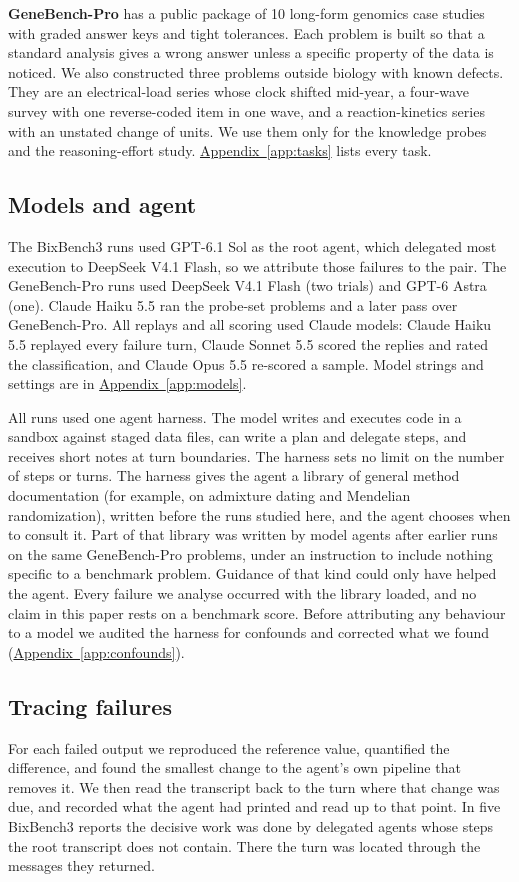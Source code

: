 \documentclass[10pt]{article}
\newcommand{\aref}[1]{\hyperref[#1]{Appendix~\ref*{#1}}}
\begin{document}
\textbf{GeneBench-Pro} \citep{openai2026genebench} has a public package of 10 long-form genomics case studies with graded answer keys
and tight tolerances. Each problem is built so that a standard analysis gives a wrong answer unless a specific property of the data
is noticed. We also constructed three problems outside biology with known defects. They are an electrical-load series whose clock shifted
mid-year, a four-wave survey with one reverse-coded item in one wave, and a reaction-kinetics series with an unstated change of units.
We use them only for the knowledge probes and the reasoning-effort study. \aref{app:tasks} lists every task.

\subsection{Models and agent}\label{sec:models}
The BixBench3 runs used GPT-6.1 Sol as the root agent, which delegated most execution to DeepSeek V4.1 Flash, so we attribute those
failures to the pair. The GeneBench-Pro runs used DeepSeek V4.1 Flash (two trials) and GPT-6 Astra (one). Claude Haiku 5.5 ran the
probe-set problems and a later pass over GeneBench-Pro. All replays and all scoring used Claude models: Claude Haiku 5.5 replayed every
failure turn, Claude Sonnet 5.5 scored the replies and rated the classification, and Claude Opus 5.5 re-scored a sample. Model strings
and settings are in \aref{app:models}.

All runs used one agent harness. The model writes and executes code in a sandbox against staged data files, can write a plan and
delegate steps, and receives short notes at turn boundaries. The harness sets no limit on the number of steps or turns. The harness
gives the agent a library of general method documentation (for example, on admixture dating and Mendelian randomization), written
before the runs studied here, and the agent chooses when to consult it. Part of that library was written by model agents after earlier runs on the
same GeneBench-Pro problems, under an instruction to include nothing specific to a benchmark problem. Guidance of that kind could only
have helped the agent. Every failure we analyse occurred with the library loaded, and no claim in this paper rests on a benchmark score.
Before attributing any behaviour
to a model we audited the harness for confounds and corrected what we found (\aref{app:confounds}).

\subsection{Tracing failures}\label{sec:tracing}
For each failed output we reproduced the reference value, quantified the difference, and found the smallest change to the agent's own
pipeline that removes it. We then read the transcript back to the turn where that change was due, and recorded what the agent had
printed and read up to that point. In five BixBench3 reports the decisive work was done by delegated agents whose steps the root
transcript does not contain. There the turn was located through the messages they returned.
\end{document}
